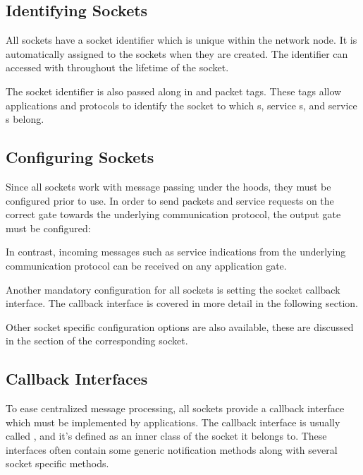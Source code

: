 \subsection*{Identifying Sockets}

All sockets have a socket identifier which is unique within the network node. It
is automatically assigned to the sockets when they are created. The identifier
can accessed with  throughout the lifetime of the socket.

The socket identifier is also passed along in  and
 packet tags. These tags allow applications and protocols to
identify the socket to which s, service s,
and service s belong.

\subsection*{Configuring Sockets}

Since all sockets work with message passing under the hoods, they must be
configured prior to use. In order to send packets and service requests on the
correct gate towards the underlying communication protocol, the output gate must
be configured:


In contrast, incoming messages such as service indications from the underlying
communication protocol can be received on any application gate.

Another mandatory configuration for all sockets is setting the socket callback
interface. The callback interface is covered in more detail in the following
section.

Other socket specific configuration options are also available, these are
discussed in the section of the corresponding socket.

\subsection*{Callback Interfaces}

To ease centralized message processing, all sockets provide a callback interface
which must be implemented by applications. The callback interface is usually
called , and it's defined as an inner class of the socket it
belongs to. These interfaces often contain some generic notification methods
along with several socket specific methods.

